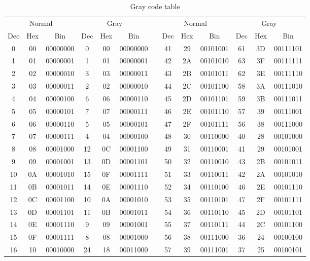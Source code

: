 \begin{table}[p]
\caption{Gray code table}
{\footnotesize
\begin{tabular}{ccccccp{1cm}cccccc}
	\toprule
\multicolumn{3}{c}{Normal} & \multicolumn{3}{c}{Gray} & & \multicolumn{3}{c}{Normal} & \multicolumn{3}{c}{Gray} \\
 Dec & Hex & Bin & Dec & Hex & Bin &  & Dec & Hex & Bin & Dec & Hex & Bin \\ 
	\midrule
 0 & 00 & 00000000 & 0 & 00 & 00000000 &  & 41 & 29 & 00101001 & 61 & 3D & 00111101 \\ 
 1 & 01 & 00000001 & 1 & 01 & 00000001 &  & 42 & 2A & 00101010 & 63 & 3F & 00111111 \\ 
 2 & 02 & 00000010 & 3 & 03 & 00000011 &  & 43 & 2B & 00101011 & 62 & 3E & 00111110 \\ 
 3 & 03 & 00000011 & 2 & 02 & 00000010 &  & 44 & 2C & 00101100 & 58 & 3A & 00111010 \\ 
 4 & 04 & 00000100 & 6 & 06 & 00000110 &  & 45 & 2D & 00101101 & 59 & 3B & 00111011 \\ 
 5 & 05 & 00000101 & 7 & 07 & 00000111 &  & 46 & 2E & 00101110 & 57 & 39 & 00111001 \\ 
 6 & 06 & 00000110 & 5 & 05 & 00000101 &  & 47 & 2F & 00101111 & 56 & 38 & 00111000 \\ 
 7 & 07 & 00000111 & 4 & 04 & 00000100 &  & 48 & 30 & 00110000 & 40 & 28 & 00101000 \\ 
 8 & 08 & 00001000 & 12 & 0C & 00001100 &  & 49 & 31 & 00110001 & 41 & 29 & 00101001 \\ 
 9 & 09 & 00001001 & 13 & 0D & 00001101 &  & 50 & 32 & 00110010 & 43 & 2B & 00101011 \\ 
 10 & 0A & 00001010 & 15 & 0F & 00001111 &  & 51 & 33 & 00110011 & 42 & 2A & 00101010 \\ 
 11 & 0B & 00001011 & 14 & 0E & 00001110 &  & 52 & 34 & 00110100 & 46 & 2E & 00101110 \\ 
 12 & 0C & 00001100 & 10 & 0A & 00001010 &  & 53 & 35 & 00110101 & 47 & 2F & 00101111 \\ 
 13 & 0D & 00001101 & 11 & 0B & 00001011 &  & 54 & 36 & 00110110 & 45 & 2D & 00101101 \\ 
 14 & 0E & 00001110 & 9 & 09 & 00001001 &  & 55 & 37 & 00110111 & 44 & 2C & 00101100 \\ 
 15 & 0F & 00001111 & 8 & 08 & 00001000 &  & 56 & 38 & 00111000 & 36 & 24 & 00100100 \\ 
 16 & 10 & 00010000 & 24 & 18 & 00011000 &  & 57 & 39 & 00111001 & 37 & 25 & 00100101 \\ 

\end{tabular}}
\end{table}
